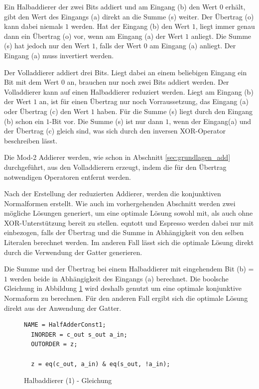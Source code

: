 Ein Halbaddierer der zwei Bits addiert und am Eingang (b) den Wert $0$ erhält, gibt den Wert des Eingangs (a) direkt an die Summe (s) weiter.
Der Übertrag (o) kann dabei niemals $1$ werden. Hat der Eingang (b) den Wert $1$, liegt immer genau dann ein Übertrag (o) vor, wenn am Eingang (a)
der Wert $1$ anliegt. Die Summe (s) hat jedoch nur den Wert $1$, falls der Wert $0$ am Eingang (a) anliegt. Der Eingang (a) muss invertiert werden.

Der Volladdierer addiert drei Bits. Liegt dabei an einem beliebigen Eingang ein Bit mit dem Wert $0$ an, brauchen nur noch zwei Bits addiert werden.
Der Volladdierer kann auf einen Halbaddierer reduziert werden. Liegt am Eingang (b) der Wert $1$ an, ist für einen Übertrag nur noch Vorraussetzung,
das Eingang (a) oder Übertrag (c) den Wert $1$ haben. Für die Summe (s) liegt durch den Eingang (b) schon ein $1$-Bit vor. Die Summe (s) ist nur dann
$1$, wenn der Eingang(a) und der Übertrag (c) gleich sind, was sich durch den inversen XOR-Operator beschreiben lässt.

Die Mod-2 Addierer werden, wie schon in Abschnitt \ref{sec:grundlagen_add} durchgeführt, aus den Volladdierern erzeugt, indem die für den Übertrag
notwendigen Operatoren entfernt werden.

Nach der Erstellung der reduzierten Addierer, werden die konjunktiven Normalformen erstellt. Wie auch im vorhergehenden Abschnitt werden zwei mögliche
Lösungen generiert, um eine optimale Lösung sowohl mit, als auch ohne XOR-Unterstützung bereit zu stellen. eqntott und Espresso werden dabei nur mit
einbezogen, falls der Übertrag und die Summe in Abhängigkeit von den selben Literalen berechnet werden. Im anderen Fall lässt sich die optimale Lösung
direkt durch die Verwendung der Gatter generieren.

Die Summe und der Übertrag bei einem Halbaddierer mit eingehendem Bit (b) = $1$ werden beide in Abhängigkeit des Eingangs (a) berechnet. Die boolsche
Gleichung in Abbildung \ref{fig:halfadder1_qen} wird deshalb genutzt um eine optimale konjunktive Normaform zu berechnen. Für den anderen Fall ergibt
sich die optimale Lösung direkt aus der Anwendung der Gatter.
\begin{figure}[!h]
  \centering
  \begin{lstlisting}[]
  NAME = HalfAdderConst1;
  INORDER = c_out s_out a_in;
  OUTORDER = z;

  z = eq(c_out, a_in) & eq(s_out, !a_in);
  \end{lstlisting}
  \caption{Halbaddierer (1) - Gleichung}
  \label{fig:halfadder1_qen}
\end{figure}

